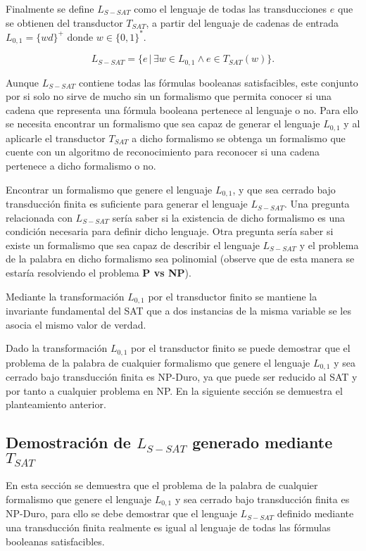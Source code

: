 Finalmente se define $L_{S-SAT}$ como el lenguaje de todas las transducciones $e$ que se obtienen del transductor $T_{SAT}$, a partir del lenguaje de cadenas de entrada $L_{0,1}=\{wd\}^+$ donde $w\in \{0,1\}^*$.

$$L_{S-SAT} = \{e\,|\,\exists w \in L_{0,1} \wedge e \in T_{SAT}(w) \}.$$

Aunque $L_{S-SAT}$ contiene todas las fórmulas booleanas satisfacibles, este conjunto por si
solo no sirve de mucho sin un formalismo que permita conocer si una cadena que representa una fórmula booleana
pertenece al lenguaje o no. Para ello se necesita encontrar un formalismo que sea capaz de generar el lenguaje
$L_{0,1}$ y al aplicarle el transductor $T_{SAT}$ a dicho formalismo se obtenga un formalismo que cuente con un
algoritmo de reconocimiento para reconocer si una cadena pertenece a dicho formalismo o no.

Encontrar un formalismo que genere el lenguaje $L_{0,1}$, y que sea cerrado bajo transducción finita es
suficiente para generar el lenguaje $L_{S-SAT}$. Una pregunta relacionada con $L_{S-SAT}$
sería saber si la existencia de dicho formalismo es una condición necesaria para definir dicho lenguaje.
Otra pregunta sería saber si existe un formalismo que sea capaz de describir el lenguaje $L_{S-SAT}$ y
el problema de la palabra en dicho formalismo sea polinomial (observe que de esta manera se estaría resolviendo el problema \textbf{P vs NP}).

Mediante la transformación $L_{0,1}$ por el transductor finito se mantiene la invariante fundamental del SAT que a dos instancias de la misma variable se les asocia el mismo valor de verdad.

Dado la transformación $L_{0,1}$ por el transductor finito se puede demostrar que el problema de la palabra de
cualquier formalismo que genere el lenguaje $L_{0,1}$ y sea cerrado bajo transducción finita es NP-Duro,
ya que puede ser reducido al SAT y por tanto a cualquier problema en NP. En la siguiente sección se demuestra
el planteamiento anterior.

\subsection{Demostración de $L_{S-SAT}$ generado mediante $T_{SAT}$}

En esta sección se demuestra que el problema de la palabra de cualquier formalismo que genere el lenguaje $L_{0,1}$ y sea cerrado bajo transducción
finita es NP-Duro, para ello se debe demostrar que el lenguaje $L_{S-SAT}$ definido mediante una transducción finita
realmente es igual al lenguaje de todas las fórmulas booleanas satisfacibles.


